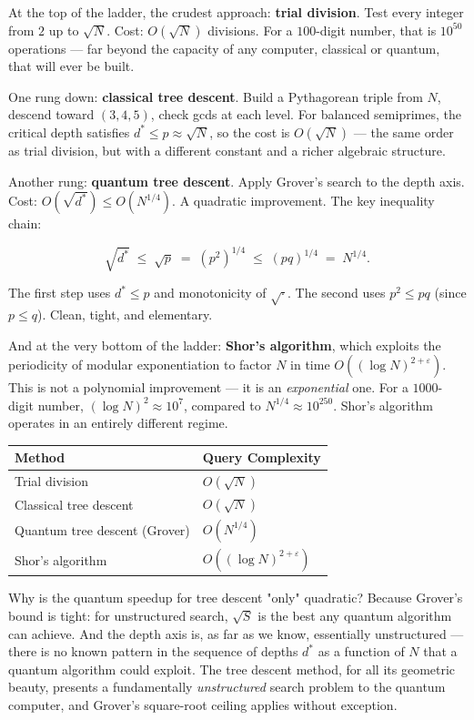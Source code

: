 At the top of the ladder, the crudest approach: \textbf{trial division}. Test every integer from $2$ up to $\sqrt{N}$. Cost: $O(\sqrt{N})$ divisions. For a $100$-digit number, that is $10^{50}$ operations --- far beyond the capacity of any computer, classical or quantum, that will ever be built.

One rung down: \textbf{classical tree descent}. Build a Pythagorean triple from $N$, descend toward $(3, 4, 5)$, check gcds at each level. For balanced semiprimes, the critical depth satisfies $d^* \leq p \approx \sqrt{N}$, so the cost is $O(\sqrt{N})$ --- the same order as trial division, but with a different constant and a richer algebraic structure.

Another rung: \textbf{quantum tree descent}. Apply Grover's search to the depth axis. Cost: $O(\sqrt{d^*}) \leq O(N^{1/4})$. A quadratic improvement. The key inequality chain:

\[\sqrt{d^*} \;\leq\; \sqrt{p} \;=\; (p^2)^{1/4} \;\leq\; (pq)^{1/4} \;=\; N^{1/4}.\]

The first step uses $d^* \leq p$ and monotonicity of $\sqrt{\cdot}$. The second uses $p^2 \leq pq$ (since $p \leq q$). Clean, tight, and elementary.

And at the very bottom of the ladder: \textbf{Shor's algorithm}, which exploits the periodicity of modular exponentiation to factor $N$ in time $O((\log N)^{2+\varepsilon})$. This is not a polynomial improvement --- it is an \textit{exponential} one. For a $1000$-digit number, $(\log N)^2 \approx 10^7$, compared to $N^{1/4} \approx 10^{250}$. Shor's algorithm operates in an entirely different regime.


\begin{center}
\begin{tabular}{ll}
\toprule
Method & Query Complexity \\
\midrule
Trial division & $O(\sqrt{N})$ \\
Classical tree descent & $O(\sqrt{N})$ \\
Quantum tree descent (Grover) & $O(N^{1/4})$ \\
Shor's algorithm & $O((\log N)^{2+\varepsilon})$ \\
\bottomrule
\end{tabular}
\end{center}


Why is the quantum speedup for tree descent "only" quadratic? Because Grover's bound is tight: for unstructured search, $\sqrt{S}$ is the best any quantum algorithm can achieve. And the depth axis is, as far as we know, essentially unstructured --- there is no known pattern in the sequence of depths $d^*$ as a function of $N$ that a quantum algorithm could exploit. The tree descent method, for all its geometric beauty, presents a fundamentally \textit{unstructured} search problem to the quantum computer, and Grover's square-root ceiling applies without exception.



